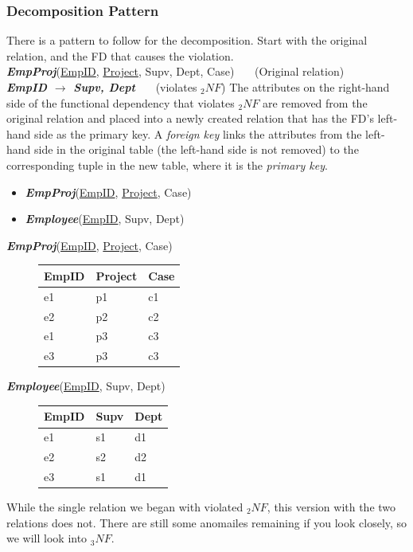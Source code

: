 \documentclass{report}
\begin{document}
\subsubsection*{Decomposition Pattern}
There is a pattern to follow for the decomposition.
\bigbreak \noindent
Start with the original relation, and the FD that causes the violation. \vspace{2mm} \\
\textit{\textbf{EmpProj}}(\underline{EmpID}, \underline{Project}, Supv, Dept, Case) \ \ \ (Original relation) \vspace{1.5mm}\\
\textit{\textbf{EmpID $\rightarrow$ Supv, Dept}}  \ \ \ (violates $_2NF$)
\bigbreak \noindent
The attributes on the right-hand side of the functional dependency that violates $_2NF$ are removed from the original relation and placed into a newly created relation that has the FD's left-hand side as the primary key. A \textit{foreign key} links the attributes from the left-hand side in the original table (the left-hand side is not removed) to the corresponding tuple in the new table, where it is the \textit{primary key}.
\bigbreak \noindent
\begin{itemize}
    
\item\textit{\textbf{EmpProj}}(\underline{EmpID}, \underline{Project}, Case)
\item\textit{\textbf{Employee}}(\underline{EmpID}, Supv, Dept)
\end{itemize}
\bigbreak \noindent
\textit{\textbf{EmpProj}}(\underline{EmpID}, \underline{Project}, Case)
    \begin{figure}[H]
    \centering
     \setlength{\tabcolsep}{25}
    \begin{tabular}{l l l}
        \hline
        EmpID & Project & Case \\
        \hline
        e1 &p1&c1 \\
        e2& p2&c2 \\
        e1& p3& c3 \\
        e3&p3&c3 \\
        \hline
    \end{tabular}
    \end{figure}
\noindent    \textit{\textbf{Employee}}(\underline{EmpID}, Supv, Dept)
    \begin{figure}[H]
    \centering
     \setlength{\tabcolsep}{25}
    \begin{tabular}{l l l}
    \hline 
    EmpID& Supv& Dept \\
    \hline
    e1&s1&d1 \\
    e2&s2&d2 \\
    e3&s1&d1 \\
    \hline
    \end{tabular}
    \end{figure}
While the single relation we began with violated $_2NF$, this version with the two relations does not. There are still some anomailes remaining if you look closely, so we will look into $_3NF$.
\end{document}
